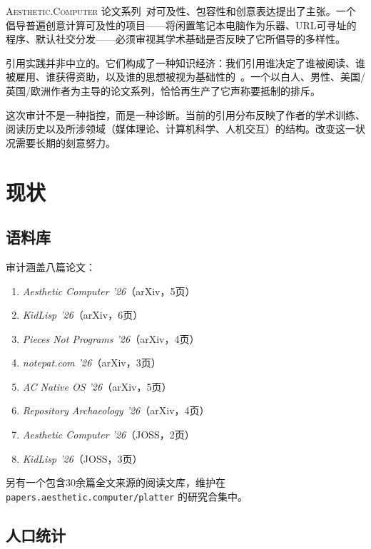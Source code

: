 \documentclass[10pt,letterpaper,twocolumn]{article}
\newcommand{\ac}{\textsc{Aesthetic.Computer}}
\begin{document}
\ac{} 论文系列~\citep{scudder2026ac, scudder2026kidlisp, scudder2026acos, scudder2026pieces, scudder2026notepat}对可及性、包容性和创意表达提出了主张。一个倡导普遍创意计算可及性的项目——将闲置笔记本电脑作为乐器、URL可寻址的程序、默认社交分发——必须审视其学术基础是否反映了它所倡导的多样性。

引用实践并非中立的。它们构成了一种知识经济：我们引用谁决定了谁被阅读、谁被雇用、谁获得资助，以及谁的思想被视为基础性的~\citep{benjamin2019race}。一个以白人、男性、美国/英国/欧洲作者为主导的论文系列，恰恰再生产了它声称要抵制的排斥。

这次审计不是一种指控，而是一种诊断。当前的引用分布反映了作者的学术训练、阅读历史以及所涉领域（媒体理论、计算机科学、人机交互）的结构。改变这一状况需要长期的刻意努力。


\section{现状}

\subsection{语料库}

审计涵盖八篇论文：

\begin{enumerate}
  \item \emph{Aesthetic Computer '26}（arXiv，5页）
  \item \emph{KidLisp '26}（arXiv，6页）
  \item \emph{Pieces Not Programs '26}（arXiv，4页）
  \item \emph{notepat.com '26}（arXiv，3页）
  \item \emph{AC Native OS '26}（arXiv，5页）
  \item \emph{Repository Archaeology '26}（arXiv，4页）
  \item \emph{Aesthetic Computer '26}（JOSS，2页）
  \item \emph{KidLisp '26}（JOSS，3页）
\end{enumerate}

另有一个包含30余篇全文来源的阅读文库，维护在 \texttt{papers.aesthetic.computer/platter} 的研究合集中。

\subsection{人口统计}
\end{document}
